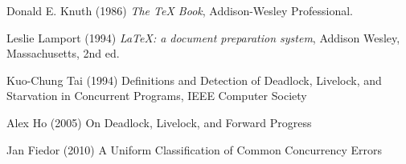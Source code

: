 \documentclass{article}
\begin{document}
\begin{thebibliography}{9}
Donald E. Knuth (1986) \emph{The \TeX{} Book}, Addison-Wesley Professional.

Leslie Lamport (1994) \emph{\LaTeX: a document preparation system}, Addison
Wesley, Massachusetts, 2nd ed.

Kuo-Chung Tai (1994) Definitions and Detection of Deadlock, Livelock, and Starvation in Concurrent Programs, IEEE Computer Society

Alex Ho (2005) On Deadlock, Livelock, and Forward Progress

Jan Fiedor (2010) A Uniform Classification of Common Concurrency Errors

\end{thebibliography}
\end{document}
